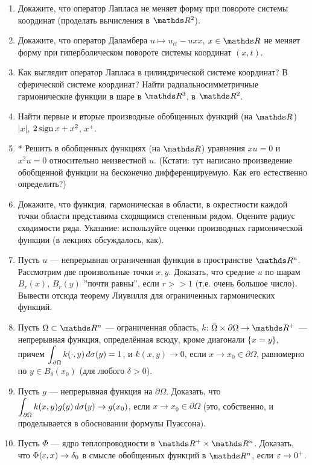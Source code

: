 \begin{enumerate}
\item  Докажите, что оператор Лапласа не меняет форму при повороте системы координат (проделать вычисления в $\real^2$).
\item Докажите, что оператор Даламбера $u\mapsto u_{tt} - u{xx}$, $x\in \real$ не меняет форму при гиперболическом повороте системы координат $(x,t)$.
\item Как выглядит оператор Лапласа в цилиндрической системе координат? В сферической системе координат? Найти радиально­симметричные гармонические функции в шаре в $\real^3$, в $\real^2$.
\item Найти первые и вторые производные обобщенных функций (на $\real$) $|x|$, $2\operatorname{sign}  x + x^2$, $x^+$.
\item * Решить в обобщенных функциях (на $\real$) уравнения $x u = 0$ и $x^2 u=0$ относительно неизвестной $u$. (Кстати: тут написано произведение обобщенной функции на бесконечно дифференцируемую. Как его естественно определить?)
\item Докажите, что функция, гармоническая в области, в окрестности каждой точки области представима сходящимся степенным рядом. Оцените радиус сходимости ряда. Указание: используйте оценки производных гармонической функции (в лекциях обсуждалось, как).
\item Пусть $u$ --- непрерывная ограниченная функция в пространстве $\real^n$. Рассмотрим две произвольные точки $x, y$. Доказать, что средние $u$ по шарам $B_r(x)$, $B_r(y)$ ''почти равны'', если $r>>1$ (т.е. очень большое число). Вывести отсюда теорему Лиувилля для ограниченных гармонических функций.
\item Пусть $\Omega\subset \real^n$ --- ограниченная область, $k$: $\bar\Omega\times\partial\Omega\to \real^+$ --- непрерывная функция, определённая всюду, кроме диагонали $\{x=y\}$, причем $\displaystyle \int_{\partial \Omega}k(\cdot,y) \, d\sigma(y)=1$, и $k(x,y)\to 0$, если $x\to x_0\in \partial \Omega$, равномерно по $y\in B_\delta (x_0)$ (для любого $\delta>0$).
\item Пусть $g$ --- непрерывная функция на $\partial \Omega$. Доказать, что $\displaystyle \int_{\partial \Omega}k(x,y)g(y) \, d\sigma(y) \to g(x_0)$, если $x\to x_0\in \partial \Omega$ (это, собственно, и проделывается в обосновании формулы Пуассона).
\item Пусть $\Phi$ --- ядро теплопроводности в $\real^+\times \real^n$. Доказать, что $\Phi(\varepsilon, x)\to \delta_0$ в смысле обобщенных функций в $\real^n$, если $\varepsilon \to 0^+$.

\end{enumerate}